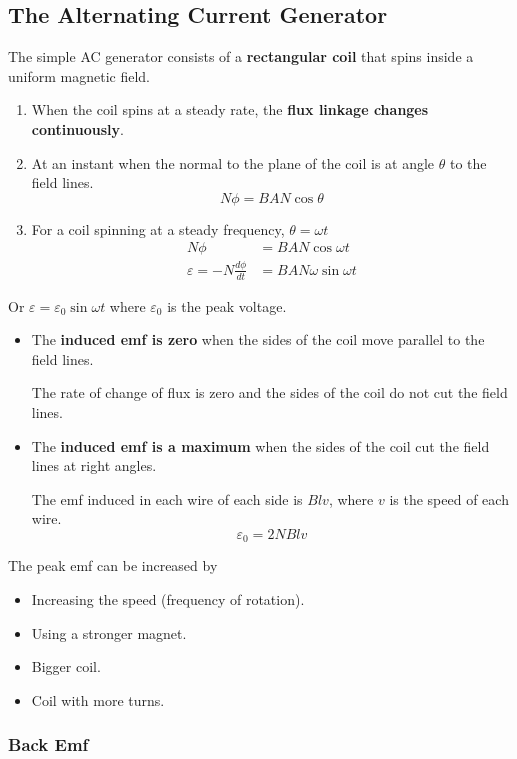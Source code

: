 \subsection{The Alternating Current Generator}

The simple AC generator consists of a \textbf{rectangular coil} that spins inside a uniform magnetic field.
\begin{enumerate}
    \item When the coil spins at a steady rate, the \textbf{flux linkage changes continuously}.
    \item At an instant when the normal to the plane of the coil is at angle $\theta$ to the field lines.
        $$N\phi=BAN\cos\theta$$
    \item For a coil spinning at a steady frequency, $\theta=\omega t$
        \begin{align*}
            N\phi&=BAN\cos\omega t\\
            \varepsilon=-N\frac{d\phi}{dt}&=BAN\omega\sin\omega t
        \end{align*}
\end{enumerate}
Or $\varepsilon=\varepsilon_0\sin\omega t$ where $\varepsilon_0$ is the peak voltage.
\begin{itemize}
    \item The \textbf{induced emf is zero} when the sides of the coil move parallel to the field lines.

        The rate of change of flux is zero and the sides of the coil do not cut the field lines.
    \item The \textbf{induced emf is a maximum} when the sides of the coil cut the field lines at right angles.

        The emf induced in each wire of each side is $Blv$, where $v$ is the speed of each wire.
        $$\varepsilon_0=2NBlv$$
\end{itemize}

The peak emf can be increased by
\begin{itemize}
    \item Increasing the speed (frequency of rotation).
    \item Using a stronger magnet.
    \item Bigger coil.
    \item Coil with more turns.
\end{itemize}

\subsubsection*{Back Emf}

